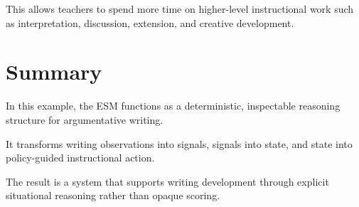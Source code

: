 \documentclass[11pt]{article}
\begin{document}
This allows teachers to spend more time on higher-level instructional work such as interpretation, discussion, extension, and creative development.

\section{Summary}

In this example, the ESM functions as a deterministic, inspectable reasoning structure for argumentative writing.

It transforms writing observations into signals, signals into state, and state into policy-guided instructional action.

The result is a system that supports writing development through explicit situational reasoning rather than opaque scoring.
\end{document}
